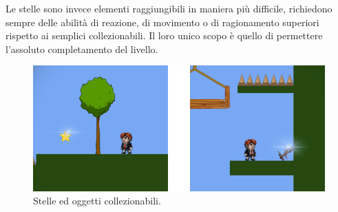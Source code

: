 Le stelle sono invece elementi raggiungibili in maniera più difficile, richiedono sempre delle abilità di reazione, di movimento o di ragionamento superiori rispetto ai semplici collezionabili. Il loro unico scopo è quello di permettere l’assoluto completamento del livello.

\begin{figure}%
	\centering
	\includegraphics[width= 0.9\columnwidth]{images/gameDesign/25_stelle_collezionabili.jpg}
	\caption{Stelle ed oggetti collezionabili.}
	\label{fig:rigiocabilita_stelle_collezionabili}
\end{figure} 
